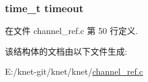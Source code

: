 \subsubsection[{timeout}]{\setlength{\rightskip}{0pt plus 5cm}time\+\_\+t timeout}\label{struct__channel__ref__info__t_afa7be8b85625b1bf5cda13fad9fd5814}


在文件 channel\+\_\+ref.\+c 第 50 行定义.



该结构体的文档由以下文件生成\+:\begin{DoxyCompactItemize}
\item 
E\+:/knet-\/git/knet/knet/\hyperlink{channel__ref_8c}{channel\+\_\+ref.\+c}\end{DoxyCompactItemize}
